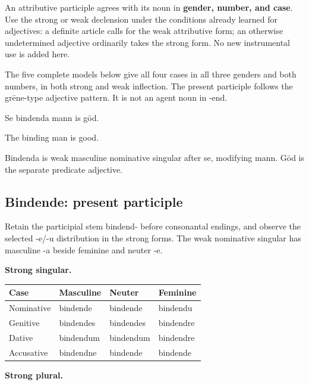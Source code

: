 An attributive participle agrees with its noun in \textbf{gender, number, and case}. Use the strong or weak declension under the conditions already learned for adjectives: a definite article calls for the weak attributive form; an otherwise undetermined adjective ordinarily takes the strong form. No new instrumental use is added here.

The five complete models below give all four cases in all three genders and both numbers, in both strong and weak inflection. The present participle follows the grēne-type adjective pattern. It is not an agent noun in -end.

Se bindenda mann is gōd.

The binding man is good.

Bindenda is weak masculine nominative singular after se, modifying mann. Gōd is the separate predicate adjective.

\subsection*{Bindende: present participle}

Retain the participial stem bindend- before consonantal endings, and observe the selected -e/\allowbreak{}-u distribution in the strong forms. The weak nominative singular has masculine -a beside feminine and neuter -e.

\textbf{Strong singular.}

\par\begingroup
\fontsize{10.5}{13.2}\selectfont
\setlength{\LTleft}{0pt}\setlength{\LTright}{\fill}
\noindent
\begin{tabular}{@{}>{\raggedright\arraybackslash}p{22.0mm}>{\raggedright\arraybackslash}p{31.188mm}>{\raggedright\arraybackslash}p{31.188mm}>{\raggedright\arraybackslash}p{31.188mm}@{}}
\toprule
\textbf{Case} & \textbf{Masculine} & \textbf{Neuter} & \textbf{Feminine} \\
\midrule
Nominative & bindende & bindende & bindendu \\
Genitive & bindendes & bindendes & bindendre \\
Dative & bindendum & bindendum & bindendre \\
Accusative & bindendne & bindende & bindende \\
\bottomrule
\end{tabular}
\par\endgroup
\textbf{Strong plural.}

